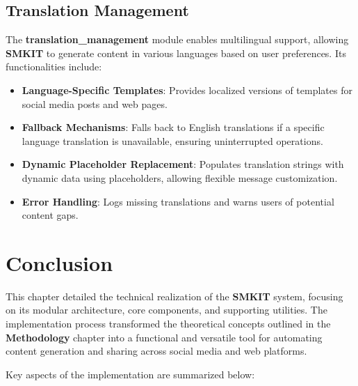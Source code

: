 \subsection{Translation Management}
\label{subsec:translation_management}
The \textbf{translation\_management} module enables multilingual support, allowing \textbf{SMKIT} to generate content in various languages based on user preferences. Its functionalities include:
\begin{itemize}
    \item \textbf{Language-Specific Templates}: Provides localized versions of templates for social media posts and web pages.
    \item \textbf{Fallback Mechanisms}: Falls back to English translations if a specific language translation is unavailable, ensuring uninterrupted operations.
    \item \textbf{Dynamic Placeholder Replacement}: Populates translation strings with dynamic data using placeholders, allowing flexible message customization.
    \item \textbf{Error Handling}: Logs missing translations and warns users of potential content gaps.
\end{itemize}


\section{Conclusion}
\label{sec:implementation_conclusion}
This chapter detailed the technical realization of the \textbf{SMKIT} system, focusing on its modular architecture, core components, and supporting utilities. The implementation process transformed the theoretical concepts outlined in the \textbf{Methodology} chapter into a functional and versatile tool for automating content generation and sharing across social media and web platforms.

Key aspects of the implementation are summarized below:

